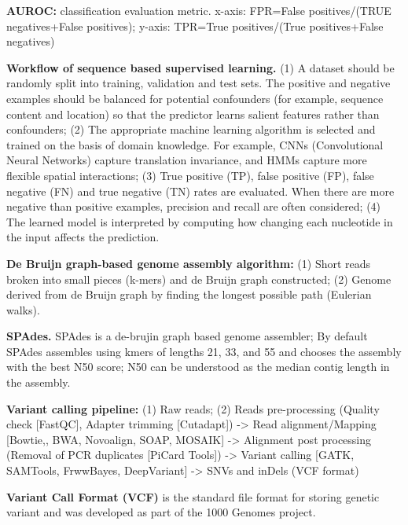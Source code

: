 \vspace{0.1em}\noindent
\textbf{AUROC:} classification evaluation metric. x-axis: FPR=False positives/(TRUE negatives+False positives); y-axis: TPR=True positives/(True positives+False negatives)

\vspace{0.1em}\noindent
\textbf{Workflow of sequence based supervised learning.} (1) A dataset should be randomly split into training, validation and test sets. The positive and negative examples should be balanced for potential confounders (for example, sequence content and location) so that the predictor learns salient features rather than confounders; (2) The appropriate machine learning algorithm is selected and trained on the basis of domain knowledge. For example, CNNs (Convolutional Neural Networks) capture translation invariance, and HMMs capture more flexible spatial interactions; (3) True positive (TP), false positive (FP), false negative (FN) and true negative (TN) rates are evaluated. When there are more negative than positive examples, precision and recall are often considered; (4) The learned model is interpreted by computing how changing each nucleotide in the input affects the prediction.

\vspace{0.1em}\noindent
\textbf{De Bruijn graph-based genome assembly algorithm:} (1) Short reads broken into small pieces (k-mers) and de Bruijn graph constructed; (2) Genome derived from de Bruijn graph by finding the longest possible path (Eulerian walks).

\vspace{0.1em}\noindent
\textbf{SPAdes.} SPAdes is a de-brujin graph based genome assembler; By default SPAdes assembles using kmers of lengths 21, 33, and 55 and chooses the assembly with the best N50 score; N50 can be understood as the median contig length in the assembly.

\vspace{0.1em}\noindent
\textbf{Variant calling pipeline:} (1) Raw reads; (2) Reads pre-processing (Quality check [FastQC], Adapter trimming [Cutadapt]) -> Read alignment/Mapping [Bowtie,, BWA, Novoalign, SOAP, MOSAIK] -> Alignment post processing (Removal of PCR duplicates [PiCard Tools]) -> Variant calling [GATK, SAMTools, FrwwBayes, DeepVariant] -> SNVs and inDels (VCF format)

\vspace{0.1em}\noindent
\textbf{Variant Call Format (VCF)} is the standard file format for storing genetic variant and was developed as part of the 1000 Genomes project.

